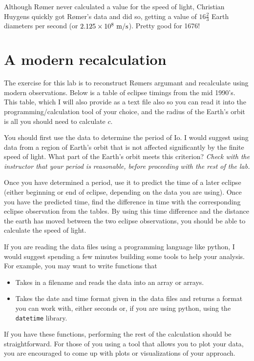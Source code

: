 \documentclass{tufte-handout}
\begin{document}
Although R{\o}mer never calculated a value for the speed of light, Christian Huygens quickly got R{\o}mer's data and did so, getting a value of $16 \frac{2}{3}$ Earth diameters per second (or $2.125\times10^8~{\rm m}/{\rm s}$).  Pretty good for 1676!

\section{A modern recalculation}

The exercise for this lab is to reconstruct R{\o}mers argumant and recalculate using modern observations.  Below is a table of eclipse timings from the mid 1990's.  This table, which I will also provide as a text file also so you can read it into the programming/calculation tool of your choice, and the radius of the Earth's orbit is all you should need to calculate $c$.

You should first use the data to determine the period of Io.  I would suggest using data from a region of Earth's orbit that is not affected significantly by the finite speed of light.  What part of the Earth's orbit meets this criterion? {\it Check with the instructor that your period is reasonable, before proceeding with the rest of the lab.}

Once you have determined a period, use it to predict the time of a later eclipse (either beginning or end of eclipse, depending on the data you are using).  Once you have the predicted time, find the difference in time with the corresponding eclipse observation from the tables.  By using this time difference and the distance the earth has moved between the two eclipse observations, you should be able to calculate the speed of light.

If you are reading the data files using a programming language like python, I would suggest spending a few minutes building some tools to help your analysis. 
For example, you may want to write functions that
\begin{itemize}
    \item Takes in a filename and reads the data into an array or arrays.
    \item Takes the date and time format given in the data files and returns a format you can work with, either seconds or, if you are using python, using the {\tt datetime} library.
\end{itemize}

If you have these functions, performing the rest of the calculation should be straightforward. For those of you using a tool that allows you to 
plot your data, you are encouraged to come up with plots or visualizations of your approach.
\end{document}

